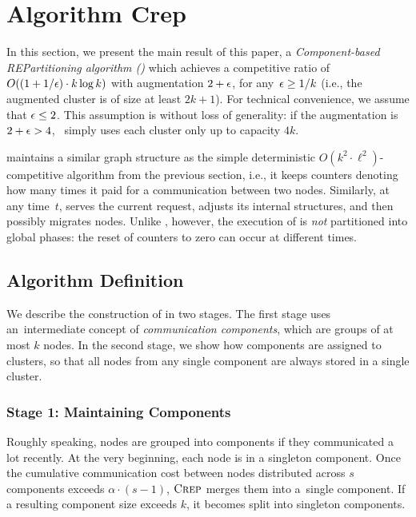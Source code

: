 
\section{Algorithm {\sc Crep}}
\label{sec:crep}

In this section, we present the main result of this paper, a
\emph{Component-based REPartitioning algorithm (\CREP)} which achieves a
competitive ratio of $O((1 + 1/\epsilon) \cdot k \log k)$ with augmentation
$2+\epsilon$, for any~$\epsilon \geq 1/k$ (i.e., the augmented cluster
is of size at least $2k+1$). For technical convenience, we assume that 
$\epsilon \leq 2$. This assumption is without loss of generality: if the augmentation 
is $2+\epsilon > 4$, \CREP~simply uses each cluster only up to capacity $4k$.

\CREP maintains a similar graph structure as the
simple deterministic $O(k^2 \cdot \ell^2)$-competitive algorithm \DET from the
previous section, i.e., it keeps counters denoting how many times it paid for a
communication between two nodes. Similarly, at any time~$t$,
\CREP serves the current request, adjusts its internal structures, and then
possibly migrates nodes. Unlike \DET, however, the execution of \CREP is
\emph{not} partitioned into global phases: the reset of counters to zero can
occur at different times.


\subsection{Algorithm Definition}

We describe the construction of \CREP in two stages. The first stage uses
an~intermediate concept of \emph{communication components}, which are groups of at
most $k$ nodes. In the second stage, we show how components are assigned to
clusters, so that all nodes from any single component are always stored in a
single cluster.


\subsubsection{Stage 1: Maintaining Components}

Roughly speaking, nodes are grouped into components if they communicated a lot
recently. At the very beginning, each node is in a singleton component. Once
the cumulative communication cost between nodes distributed across $s$
components exceeds $\alpha \cdot (s-1)$, $\textsc{Crep}$ merges them into a~single
component. If a resulting component size exceeds $k$, it becomes split
into singleton components.

